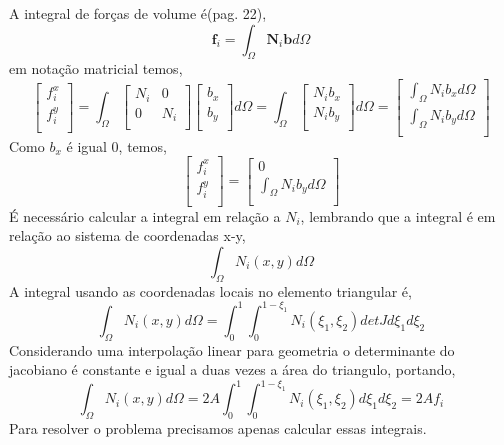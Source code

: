 A integral de forças de volume é(pag. 22),
%
\begin{equation}
\mathbf{f}_i = \int_{\Omega} \mathbf{N}_i \mathbf{b} d\Omega
\end{equation}
%
em notação matricial temos,
%
\begin{equation}
	\begin{bmatrix}
	f^x_i\\
	f^y_i\\
	\end{bmatrix}
	=
	\int_{\Omega}
	\begin{bmatrix}
	N_i&0\\
	0&N_i\\
	\end{bmatrix}
	\begin{bmatrix}
	b_x\\
	b_y\\
	\end{bmatrix}
	d\Omega
	=
	\int_{\Omega}
	\begin{bmatrix}
		N_i b_x\\
		N_i b_y\\
	\end{bmatrix}
	d\Omega
	=
	\begin{bmatrix}
	\int_{\Omega} N_i b_x d\Omega\\
	\int_{\Omega} N_i b_y d\Omega\\
	\end{bmatrix}
\end{equation}
%
Como $b_x$ é igual 0, temos,
%
\begin{equation}
	\begin{bmatrix}
		f^x_i\\
		f^y_i\\
	\end{bmatrix}
	=
	\begin{bmatrix}
		0\\
		\int_{\Omega} N_i b_y d\Omega\\
	\end{bmatrix}
\end{equation}
%
É necessário calcular a integral em relação a $N_i$, lembrando que a integral é em relação ao sistema de coordenadas x-y,
%
\begin{equation}
\int_{\Omega} N_i(x,y) d\Omega
\end{equation}
%
A integral usando as coordenadas locais no elemento triangular é,
%
\begin{equation}
	\int_{\Omega} N_i(x,y) d\Omega = \int_{0}^{1} \int_{0}^{1-\xi_1}  N_i(\xi_1,\xi_2) det J d \xi_1 d \xi_2 
\end{equation}
%
Considerando uma interpolação linear para geometria o determinante do jacobiano é constante e igual a duas vezes a área do triangulo, portando,
%
\begin{equation}
	\int_{\Omega} N_i(x,y) d\Omega = 2 A \int_{0}^{1} \int_{0}^{1-\xi_1}  N_i(\xi_1,\xi_2) d \xi_1 d \xi_2 = 2 A f_i
\end{equation}
%
Para resolver o problema precisamos apenas calcular essas integrais.

